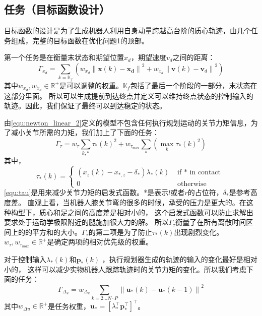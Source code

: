\subsection{任务（目标函数设计）}
\label{cost_function}
目标函数的设计是为了生成机器人利用自身动量跨越高台阶的质心轨迹，由几个任务组成，完整的目标函数在优化问题1的顶部。

第一个任务是在衡量末状态和期望位置${x}_d$，期望速度${v}_d$之间的距离：
\begin{equation}
    \label{equ:cost_1}
    \Gamma_{x_d}=\sum_{k=\mathbb{K}_f}\left(w_{x_d}\left\|\boldsymbol{x}(k)-\boldsymbol{x}_{\boldsymbol{d}}\right\|^2+w_{\dot{x}_d}\left\|\boldsymbol{v}(k)-\boldsymbol{v}_d\right\|^2\right)
\end{equation}
其中$w_{x_d}, w_{\dot{x}_d} \in \mathbb{R}^{+}$是可以调整的权重。$\mathbb{K}_f$包括了最后一个阶段的一部分，末状态在这部分里面。
所以可以生成提前到达终点并定义可以维持终点状态的控制输入的轨迹。因此，我们保证了最终可以到达稳定的状态。

由\autoref{equ:newton_linear_2}定义的模型不包含任何执行规划运动的关节力矩信息，为了减小关节所需的力矩，我们加上了下面的任务：
\begin{equation}
    \label{equ:cost_2}
    \Gamma_\tau=w_\tau \sum_{k, *} \tau_*(k)^2+w_{\tau_{\max }} \sum_*\left(\max _k \tau_*(k)^2\right)
\end{equation}
其中，
\begin{equation}
    \label{equ:tau}
    \tau_*(k)= \begin{cases}\left(x_z(k)-x_{*, z}-\delta_*\right) \lambda_*(k) & \text { if } * \text { in contact } \\ 0 & \text { otherwise }\end{cases}
\end{equation}
\autoref{equ:tau}是用来减少关节力矩的启发式函数。*是表示$l$或者$r$的占位符，$\delta_*$是参考高度差。
直观上看，当机器人膝关节弯的很多的时候，承受的压力是更大的。在这种构型下，质心和足之间的高度差是相对小的，
这个启发式函数可以防止求解出要求处于运动学极限附近的腿施加很大力的解。
所以$\Gamma_\tau$衡量了在所有离散时间区间上的的平方和的大小。$\Gamma_\tau$的第二项是为了防止$\tau_*(k)$出现剧烈变化。
$w_{\tau}, w_{\tau_{max}} \in \mathbb{R}^+$是确定两项的相对优先级的权重。

对于控制输入$\lambda_*(k)$和$\boldsymbol{p}_*(k)$ ，执行规划器生成的轨迹的输入的变化最好是相对小的，
这样可以减少实物机器人跟踪轨迹时的关节力矩的变化。所以我们考虑下面的任务：
\begin{equation}
    \label{equ:cost_3}
    \Gamma_{\Delta_u}=w_{\Delta_u} \sum_{k=2 \ldots N \cdot P}\left\|\boldsymbol{u}_*(k)-\boldsymbol{u}_*(k-1)\right\|^2
\end{equation}
其中$w_{\Delta u} \in \mathbb{R}^+$是任务权重，$\boldsymbol{u}_*=\left[\lambda_*^{\top} \boldsymbol{p}_*^{\top}\right]^{\top}$。

